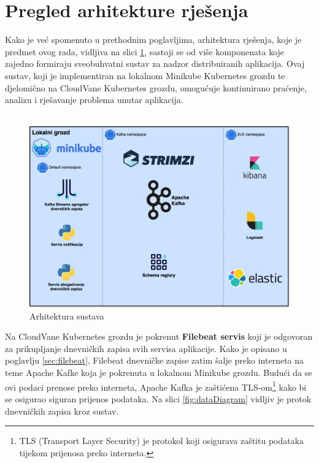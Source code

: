\documentclass[times, utf8, diplomski]{fer}
\begin{document}
\section{Pregled arhitekture rješenja}

Kako je već spomenuto u prethodnim poglavljima, arhitektura rješenja, koje je predmet ovog rada, vidljiva na slici \ref{fig:archDiagram}, sastoji se od više komponenata koje zajedno formiraju sveobuhvatni sustav za nadzor distribuiranih aplikacija. Ovaj sustav, koji je implementiran na lokalnom Minikube Kubernetes grozdu te djelomično na CloudVane Kubernetes grozdu, omogućuje kontinuirano praćenje, analizu i rješavanje problema unutar aplikacija.\\\\

\begin{figure}[htb]
	\centering
	\includegraphics[width=15cm]{images/ThesisArchitecture.png}
	\caption[Arhitektura sustava]{Arhitektura sustava}
	\label{fig:archDiagram}
\end{figure}

Na CloudVane Kubernetes grozdu je pokrenut \textbf{Filebeat servis} koji je odgovoran za prikupljanje dnevničkih zapisa svih servisa aplikacije. Kako je opisano u poglavlju \ref{sec:filebeat}, Filebeat dnevničke zapise zatim šalje preko interneta na teme Apache Kafke koja je pokrenuta u lokalnom Minikube grozdu. Budući da se ovi podaci prenose preko interneta, Apache Kafka je zaštićena TLS-om\footnote{TLS (Transport Layer Security) je protokol koji osigurava zaštitu podataka tijekom prijenosa preko interneta.} kako bi se osigurao siguran prijenos podataka. Na slici \ref{fig:dataDiagram} vidljiv je protok dnevničkih zapisa kroz sustav.
\end{document}
